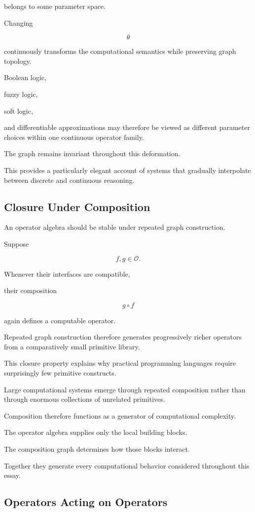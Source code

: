 \documentclass[12pt,oneside]{article}
\begin{document}
belongs to some parameter space.

Changing

\[
\theta
\]

continuously transforms the computational semantics while preserving graph topology.

Boolean logic,

fuzzy logic,

soft logic,

and differentiable approximations may therefore be viewed as different parameter choices within one continuous operator family.

The graph remains invariant throughout this deformation.

This provides a particularly elegant account of systems that gradually interpolate between discrete and continuous reasoning.

\subsection{Closure Under Composition}

An operator algebra should be stable under repeated graph construction.

Suppose

\[
f,g
\in
\mathcal O.
\]

Whenever their interfaces are compatible,

their composition

\[
g\circ f
\]

again defines a computable operator.

Repeated graph construction therefore generates progressively richer operators from a comparatively small primitive library.

This closure property explains why practical programming languages require surprisingly few primitive constructs.

Large computational systems emerge through repeated composition rather than through enormous collections of unrelated primitives.

Composition therefore functions as a generator of computational complexity.

The operator algebra supplies only the local building blocks.

The composition graph determines how those blocks interact.

Together they generate every computational behavior considered throughout this essay.

\subsection{Operators Acting on Operators}
\end{document}
